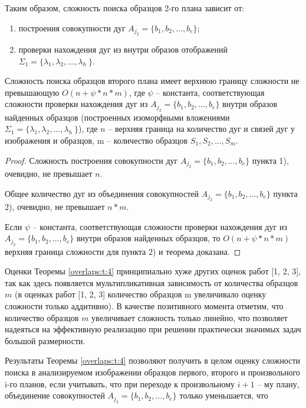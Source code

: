 Таким образом, сложность  поиска образцов 2-го плана зависит от:
\begin{enumerate}
\item построения  совокупности дуг $A_{j_2}  =  \{ b_1, b_2 ,..., b_e\}$;
\item проверки нахождения дуг из внутри  образов отображений  $\Sigma_1  =  \{\lambda_1, \lambda_2 ,..., \lambda_h\ \}$.
\end{enumerate}

\begin{theorem}
Сложность поиска образцов второго плана имеет верхнюю границу сложности не превышающую  
$O(n+\psi *n*m )$,  где  $\psi$  -- константа, соответствующая сложности проверки нахождения дуг из  $A_{j_2}  =  \{ b_1, b_2 ,..., b_e\}$  внутри  образов найденных образцов (построенных изоморфными вложениями $\Sigma_1  =  \{\lambda_1, \lambda_2 ,..., \lambda_h\ \}$),  где  $n$ -- верхняя граница на количество дуг и связей дуг у изображения и образцов,  m -- количество образцов  $S_1, S_2, ..., S_m$.
\label{overlaps:t:4}
\end{theorem}
\begin{proof}
Сложность построения совокупности дуг $A_{j_2}  =  \{ b_1, b_2 ,..., b_e\}$ пункта  1), очевидно, не превышает  $n$.

Общее количество дуг из объединения совокупностей  $A_{j_2}  =  \{ b_1, b_2 ,..., b_e\}$ пункта  2), очевидно, не превышает   $n*m$. 

Если  $\psi$  -- константа, соответствующая сложности проверки нахождения дуг из $A_{j_2}  =  \{ b_1, b_2 ,..., b_e\}$  внутри  образов найденных образцов,  то  $O(n+\psi *n*m )$ верхняя граница сложности для  пункта  2) и теорема доказана.
\end{proof}

\begin{remark}
Оценки Теоремы \ref{overlaps:t:4} принципиально хуже  других оценок работ
[1, 2, 3], так как здесь появляется мультипликативная зависимость  от количества образцов  $m$  (в оценках  работ [1, 2, 3] количество образцов  m  увеличивало оценку сложности  только аддитивно). В качестве позитивного момента отметим, что количество образцов  $m$ увеличивает сложность только линейно, что позволяет надеяться на эффективную реализацию при  решении практически значимых задач большой размерности.
\label{overlaps:r:3}
\end{remark}

Результаты  Теоремы \ref{overlaps:t:4}   позволяют получить в целом оценку сложности поиска в анализируемом изображении образцов первого, второго и произвольного i-го планов, если учитывать, что  при переходе к произвольному $i+1$ -- му плану, объединение совокупностей  $A_{j_2}  =  \{ b_1, b_2 ,..., b_e\}$  только уменьшается, что  

